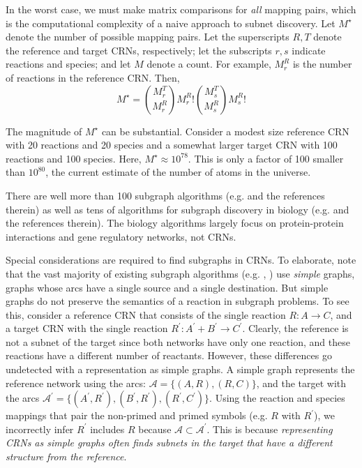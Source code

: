 \documentclass[webpdf,contemporary,large]{oup-authoring-template}
\theoremstyle{thmstyleone}%
\theoremstyle{thmstyletwo}%
\theoremstyle{thmstylethree}%
\begin{document}
In the worst case, we must make matrix comparisons for {\em all} mapping pairs, which is the computational complexity of a naive approach to subnet discovery.
Let $M^{\star}$ denote the number of possible mapping pairs.
Let the superscripts $R, T$ denote the reference and target CRNs, respectively; let the subscripts $r, s$ indicate reactions and species; and
let $M$ denote a count.
For example, $M^R_r$ is the number of reactions in the reference CRN.
Then,
\begin{equation}
   M^{\star} = \binom{M^T_r}{M^R_r} {M^R_r}!
   \binom{M^T_s}{M^R_s} {M^R_s}!
   \label{eq:naive}
\end{equation}

The magnitude of $M^{\star}$ can be substantial.
Consider a modest size reference CRN with 20 reactions and 20 species and a somewhat larger target CRN with 100 reactions and 100 species.
Here, $M^{\star} \approx 10^{78}$.
This is only a factor of 100 smaller than $10^{80}$,
the current
estimate of the number of atoms in the universe.

There are well more than 100 subgraph algorithms
(e.g. \citep{conte_thirty_2004} and the references therein)
as well as tens of algorithms for
subgraph discovery in biology
(e.g. \citep{milano_challenges_2022} and the references therein).
The biology algorithms largely focus on protein-protein interactions and gene regulatory networks, not CRNs.

Special considerations are required
to find subgraphs in CRNs.
To elaborate, note that the vast majority of existing subgraph algorithms (e.g. \citep{gadducci_glasgow_2020}, \citep{cordella_subgraph_2004}) use {\em simple} graphs, graphs whose arcs have a single source and a single destination. But simple graphs do not preserve the semantics of a reaction in subgraph problems.
To see this, consider a reference CRN that consists of the single reaction $R: A \rightarrow C$, and a target CRN with the single reaction $R^{\prime}: A^{\prime} + B^{\prime} \rightarrow C^{\prime}$.
Clearly, the reference is not a subnet of the target since
both networks have only one reaction, and these reactions have a different number of reactants.
However, these differences go undetected with a representation as
simple graphs.
A simple graph represents
the reference network using the arcs: ${\mathcal A} = \{(A, R), (R, C)\}$, and
the target with the arcs ${\mathcal A}^{\prime} = \{(A^{\prime}, R^{\prime}), (B^{\prime}, R^{\prime}), (R^{\prime}, C^{\prime})\}$.
Using the reaction and species mappings that pair the non-primed and primed symbols (e.g. $R$ with $R^{\prime}$), we incorrectly infer $R^{\prime}$ includes $R$ because ${\mathcal A} \subset {\mathcal A}^{\prime}$.
 This is because {\em representing CRNs as simple graphs often finds subnets in the target that have a different structure from the reference}.
 
\end{document}
